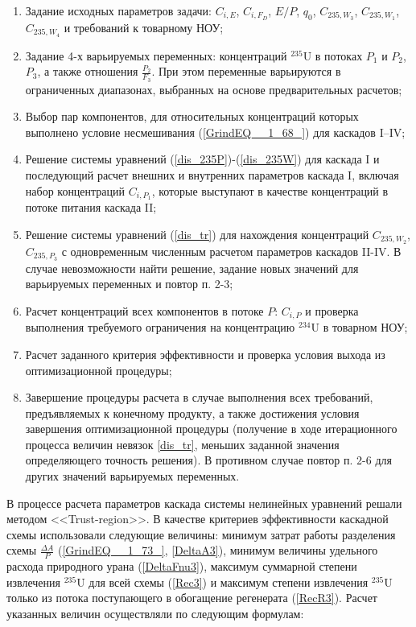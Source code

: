 \begin{enumerate}
    \item Задание исходных параметров задачи: $C_{i,E}$, $C_{i,F_D}$, $E/P$, $q_0$, $C_{235,{W_3}}$, $C_{235,{W_1}}$, $C_{235,{W_4}}$ и требований к товарному НОУ;
    \item Задание 4-х варьируемых переменных: концентраций $^{235}$U в потоках $P_1$ и $P_2$, $P_3$, а также отношения $\frac{P_{2}}{F_3}$. При этом переменные варьируются в ограниченных диапазонах, выбранных на основе предварительных расчетов; 
    \item Выбор пар компонентов, для относительных концентраций которых выполнено условие несмешивания (\ref{GrindEQ__1_68_}) для каскадов I--IV;
    \item Решение системы уравнений (\ref{dis_235P})-(\ref{dis_235W}) для каскада I и последующий расчет внешних и внутренних параметров каскада I, включая набор концентраций $C_{i,{P_1}}$, которые выступают в качестве концентраций в потоке питания каскада II;
    \item Решение системы уравнений (\ref{dis_tr}) для нахождения концентраций $C_{235,{W_2}}$, $C_{235,{P_3}}$ с одновременным численным расчетом параметров каскадов II-IV. В случае невозможности найти решение, задание новых значений для варьируемых переменных и повтор п. 2-3;
    \item Расчет концентраций всех компонентов в потоке $P$: $C_{i, P}$ и проверка выполнения требуемого ограничения на концентрацию $^{234}$U в товарном НОУ;
    \item Расчет заданного критерия эффективности и проверка условия выхода из оптимизационной процедуры;
    \item Завершение процедуры расчета в случае выполнения всех требований, предъявляемых к конечному продукту, а также достижения условия завершения оптимизационной процедуры (получение в ходе итерационного процесса величин невязок \ref{dis_tr}, меньших заданной значения определяющего точность решения). В противном случае повтор п. 2-6 для других значений варьируемых переменных.
\end{enumerate}

В процессе расчета параметров каскада системы нелинейных уравнений решали методом <<Trust-region>>. В качестве критериев эффективности каскадной схемы использовали следующие величины: минимум затрат работы разделения схемы $\frac{\Delta A}{P}$ (\ref{GrindEQ__1_73_}, \ref{DeltaA3}), минимум величины удельного расхода природного урана (\ref{DeltaFnu3}), максимум суммарной степени извлечения $^{235}$U для всей схемы (\ref{Rec3}) и максимум степени извлечения $^{235}$U только из потока поступающего в обогащение регенерата (\ref{RecR3}). Расчет указанных величин осуществляли по следующим формулам:

